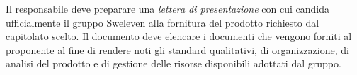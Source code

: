 Il responsabile %
deve preparare una \emph{lettera di presentazione} con cui candida ufficialmente il gruppo Sweleven alla fornitura del prodotto richiesto dal capitolato scelto. Il documento deve elencare i documenti che vengono forniti al proponente al fine di rendere noti gli standard qualitativi, di organizzazione, di analisi del prodotto e di gestione delle risorse disponibili adottati dal gruppo.